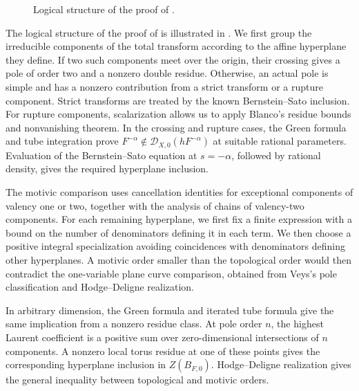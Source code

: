 \documentclass[12pt]{amsart}
\numberwithin{equation}{section}
\theoremstyle{plain}
\theoremstyle{definition}
\theoremstyle{remark}
\theoremstyle{definition}
\newcommand{\D}{\mathscr D}
\begin{document}
\begin{figure}[t]

\caption{Logical structure of the proof of .}
\label{fig:plane-smc-proof}
\end{figure}


The logical structure of the proof of  is illustrated in . We first group the irreducible components of the total transform according to the affine hyperplane they define. If two such components meet over the origin, their crossing gives a pole of order two and a nonzero double residue. Otherwise, an actual pole is simple and has a nonzero contribution from a strict transform or a rupture component. Strict transforms are treated by the known Bernstein--Sato inclusion. For rupture components, scalarization allows us to apply Blanco's residue bounds and nonvanishing theorem. In the crossing and rupture cases, the Green formula and tube integration prove $F^{-\alpha}\notin\D_{X,0}(hF^{-\alpha})$ at suitable rational parameters. Evaluation of the Bernstein--Sato equation at $s=-\alpha$, followed by rational density, gives the required hyperplane inclusion.

The motivic comparison uses cancellation identities for exceptional components of valency one or two, together with the analysis of chains of valency-two components. For each remaining hyperplane, we first fix a finite expression with a bound on the number of denominators defining it in each term. We then choose a positive integral specialization avoiding coincidences with denominators defining other hyperplanes. A motivic order smaller than the topological order would then contradict the one-variable plane curve comparison, obtained from Veys's pole classification and Hodge--Deligne realization.

In arbitrary dimension, the Green formula and iterated tube formula give the same implication from a nonzero residue class. At pole order $n$, the highest Laurent coefficient is a positive sum over zero-dimensional intersections of $n$ components. A nonzero local torus residue at one of these points gives the corresponding hyperplane inclusion in $Z(B_{F,0})$. Hodge--Deligne realization gives the general inequality between topological and motivic orders.
\end{document}
